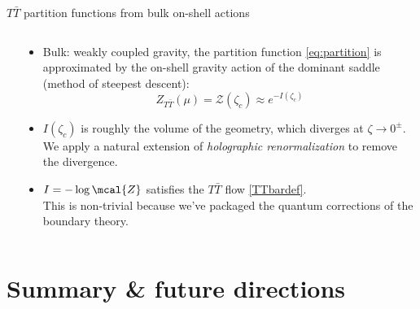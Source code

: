 \documentclass[aspectratio=169,10pt
	,noamsthm
]{beamer}
\newcommand{\TTbar}{\texorpdfstring{\ensuremath{T\bar{T}}}{TTbar}\xspace}
\begin{document}
\begin{frame}{\TTbar partition functions from bulk on-shell actions}{%
	\textcite{Kraus:2021cwf,Apolo:2023vnm}
}
\begin{columns}
\begin{column}{.35\textwidth}
\figGlueon
\end{column}
\begin{column}{.65\textwidth}
\vspace{-.3\baselineskip}
\begin{itemize}
\item Bulk: weakly coupled gravity, the partition function \eqref{eq:partition} is approximated by the on-shell gravity action of the dominant saddle (method of steepest descent):
	\begin{equation}
		Z_{T\bar T} (\mu) = \mathcal Z (\zeta_c) \approx  e^{-I(\zeta_c)}\label{partition2}
	\end{equation}

\pause
\item $I(\zeta_c)$ is roughly the volume of the geometry, which diverges at $\zeta \to 0^\pm$. We apply a natural extension of \textit{holographic renormalization} to remove the divergence.

\pause
\item $I = -\log \mcal{Z}$ satisfies the \TTbar flow \eqref{TTbardef}.\\
	This is non-trivial because we've packaged the quantum corrections of the boundary theory.
\end{itemize}
\end{column}
\end{columns}
\end{frame}

\section{Summary \& future directions}
\end{document}
